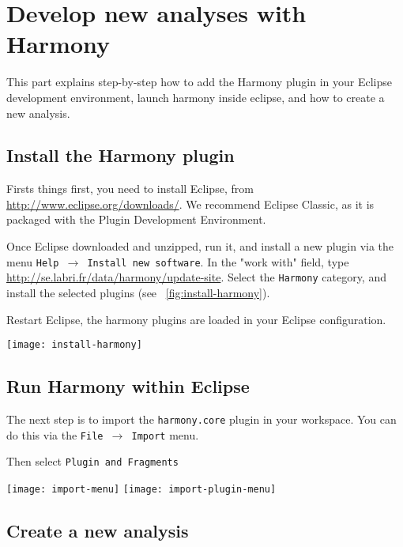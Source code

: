 \chapter{Develop new analyses with Harmony}

This part explains step-by-step how to add the Harmony plugin in your Eclipse development environment, launch harmony inside eclipse, and how to create a new analysis.


\section{Install the Harmony plugin}
Firsts things first, you need to install Eclipse, from \url{http://www.eclipse.org/downloads/}. We recommend Eclipse Classic, as it is packaged with the Plugin Development Environment.

Once Eclipse downloaded and unzipped, run it, and install a new plugin via the menu \texttt{Help $\rightarrow$ Install new software}. In the "work with" field, type \url{http://se.labri.fr/data/harmony/update-site}. Select the \texttt{Harmony} category, and install the selected plugins (see \figurename~\ref{fig:install-harmony}).

Restart Eclipse, the harmony plugins are loaded in your Eclipse configuration.

\texttt{[image: install-harmony]}

\section{Run Harmony within Eclipse}

The next step is to import the \texttt{harmony.core} plugin in your workspace.
You can do this via the \texttt{File $\rightarrow$ Import} menu.

Then select \texttt{Plugin and Fragments}

\texttt{[image: import-menu]}
\texttt{[image: import-plugin-menu]}

\section{Create a new analysis}


